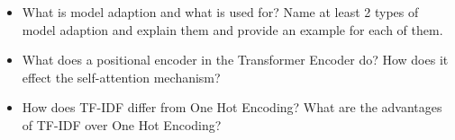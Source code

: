 {\begin{tcolorbox}[skin=widget,
    	coltitle=black,
    	colframe=s-group3!30,
    	colback=s-group3!10,
    	fontupper=\footnotesize,
    	adjusted title=Group 3,
    	boxrule=2mm]
\begin{itemize}
    	\end{itemize}
    \end{tcolorbox}
       	
     \begin{tcolorbox}[skin=widget,
    	coltitle=black,
    	colframe=s-group4!30,
    	colback=s-group4!10,
    	fontupper=\footnotesize,
    	adjusted title=Group 4,
    	boxrule=2mm]
    	\begin{itemize}
    		\setlength\itemsep{-0.2em}
    		\item What is model adaption and what is used for? Name at least 2 types of model adaption and explain them and provide an example for each of them.
    		\item What does a positional encoder in the Transformer Encoder do? How does it effect the self-attention mechanism?
    		\item How does TF-IDF differ from One Hot Encoding? What are the advantages of TF-IDF over One Hot Encoding?

    	\end{itemize}
    \end{tcolorbox}

}

